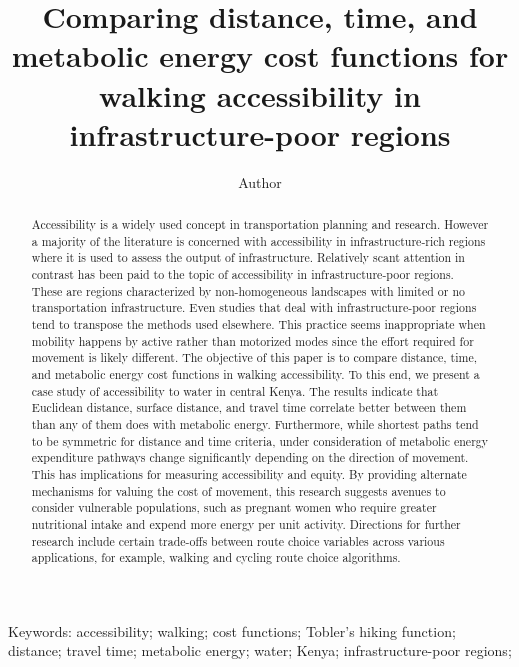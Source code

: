 \documentclass[]{elsarticle} %
\begin{document}
\begin{frontmatter}

  \title{Comparing distance, time, and metabolic energy cost functions for
walking accessibility in infrastructure-poor regions}
    \author[Academic Unit]{Author}
      \address[Academic Unit]{Somewhere}
  
  \begin{abstract}
  Accessibility is a widely used concept in transportation planning and
  research. However a majority of the literature is concerned with
  accessibility in infrastructure-rich regions where it is used to assess
  the output of infrastructure. Relatively scant attention in contrast has
  been paid to the topic of accessibility in infrastructure-poor regions.
  These are regions characterized by non-homogeneous landscapes with
  limited or no transportation infrastructure. Even studies that deal with
  infrastructure-poor regions tend to transpose the methods used
  elsewhere. This practice seems inappropriate when mobility happens by
  active rather than motorized modes since the effort required for
  movement is likely different. The objective of this paper is to compare
  distance, time, and metabolic energy cost functions in walking
  accessibility. To this end, we present a case study of accessibility to
  water in central Kenya. The results indicate that Euclidean distance,
  surface distance, and travel time correlate better between them than any
  of them does with metabolic energy. Furthermore, while shortest paths
  tend to be symmetric for distance and time criteria, under consideration
  of metabolic energy expenditure pathways change significantly depending
  on the direction of movement. This has implications for measuring
  accessibility and equity. By providing alternate mechanisms for valuing
  the cost of movement, this research suggests avenues to consider
  vulnerable populations, such as pregnant women who require greater
  nutritional intake and expend more energy per unit activity. Directions
  for further research include certain trade-offs between route choice
  variables across various applications, for example, walking and cycling
  route choice algorithms.
  \end{abstract}
  
 \end{frontmatter}

Keywords: accessibility; walking; cost functions; Tobler's hiking
function; distance; travel time; metabolic energy; water; Kenya;
infrastructure-poor regions;
\end{document}
